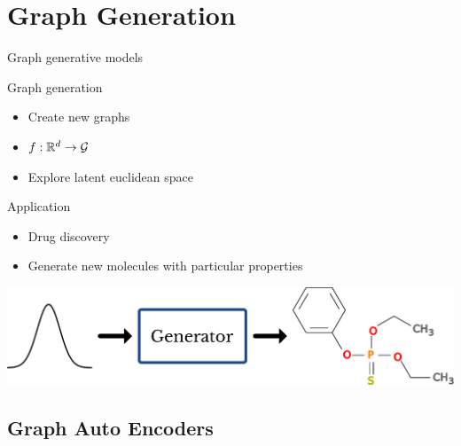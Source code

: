 \documentclass[11pt]{beamer}
\begin{document}
    
    

\section{Graph Generation}
\begin{frame}{Graph generative models}
  \begin{block}{Graph generation}
    \begin{itemize}
    \item Create new graphs
    \item $f : {\mathbb{R}}^d \to \mathcal{G}$
    \item Explore latent euclidean space
    \end{itemize}
  \end{block}
  \begin{block}{Application}
    \begin{itemize}
    \item Drug discovery
    \item Generate new molecules with particular properties 
    \end{itemize}
  \end{block}
  \begin{center}
    \includegraphics[width=.8\textwidth]{graph_generator}
  \end{center}
\end{frame}


\subsection{Graph Auto Encoders}
\end{document}
